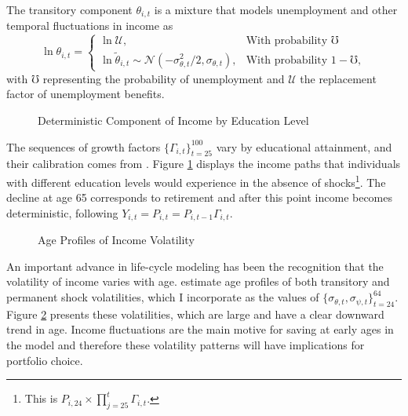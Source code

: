 \documentclass[./RiskyContrib.tex]{subfiles}
\begin{document}
The transitory component $\theta_{i,t}$ is a mixture that models unemployment and
other temporal fluctuations in income as
\begin{equation*}
\ln\theta_{i,t} = \begin{cases}
\ln \mathcal{U}, & \text{With probability } \mho\\
\ln \tilde{\theta}_{i,t}\sim\mathcal{N}(-\sigma^2_{\theta,t}/2, \sigma_{\theta,t}), & \text{With probability } 1-\mho,
\end{cases}
\end{equation*}
with $\mho$ representing the probability of unemployment and $\mathcal{U}$ the replacement
factor of unemployment benefits.

\begin{figure}
\begin{center}
\caption{Deterministic Component of Income by Education Level}\label{fig:income_paths}
\end{center}
\end{figure}

The sequences of growth factors $\{\Gamma_{i,t}\}_{t=25}^{100}$ vary by educational attainment,
and their calibration comes from \cite{Cagetti2003jbes}. Figure \ref{fig:income_paths}
displays the income paths that individuals with different education levels would experience
in the absence of shocks\footnote{This is $P_{i,24}\times\prod_{j=25}^{t} \Gamma_{i,t}$.}. The
decline at age 65 corresponds to retirement and after this point income becomes deterministic,
following $Y_{i,t} = P_{i,t} = P_{i,t-1}\Gamma_{i,t}$.

\begin{figure}
\begin{center}
\caption{Age Profiles of Income Volatility}\label{fig:volat_paths}
\end{center}
\end{figure}

An important advance in life-cycle modeling has been the recognition that
the volatility of income varies with age. \cite{Sabelhaus2010jme} estimate
age profiles of both transitory and permanent shock volatilities, which I
incorporate as the values of $\{\sigma_{\theta,t}, \sigma_{\psi,t}\}_{t=24}^{64}$.
Figure \ref{fig:volat_paths} presents these volatilities, which are large and have
a clear downward trend in age. Income fluctuations are the main motive for saving
at early ages in the model and therefore these volatility patterns will have
implications for portfolio choice.
\end{document}
